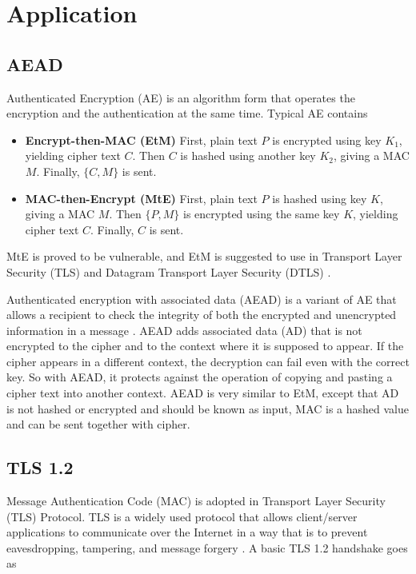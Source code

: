 \section{Application}

\subsection{AEAD}

	Authenticated Encryption (AE) is an algorithm form that operates the encryption and the authentication at the same time. Typical AE contains

	\begin{itemize}
		\item
			\textbf{Encrypt-then-MAC (EtM)}
			First, plain text $P$ is encrypted using key $K_1$, yielding cipher text $C$. Then $C$ is hashed using another key $K_2$, giving a MAC $M$. Finally, $\{C,M\}$ is sent.
		\item
			\textbf{MAC-then-Encrypt (MtE)}
			First, plain text $P$ is hashed using key $K$, giving a MAC $M$. Then $\{P,M\}$ is encrypted using the same key $K$, yielding cipher text $C$. Finally, $C$ is sent.
	\end{itemize}

	MtE is proved to be vulnerable, and EtM is suggested to use in Transport Layer Security (TLS) and Datagram Transport Layer Security (DTLS) \cite{etm}.

	Authenticated encryption with associated data (AEAD) is a variant of AE that allows a recipient to check the integrity of both the encrypted and unencrypted information in a message \cite{nist-18}. AEAD adds associated data (AD) that is not encrypted to the cipher and to the context where it is supposed to appear. If the cipher appears in a different context, the decryption can fail even with the correct key. So with AEAD, it protects against the operation of copying and pasting a cipher text into another context. AEAD is very similar to EtM, except that AD is not hashed or encrypted and should be known as input, MAC is a hashed value and can be sent together with cipher.

\subsection{TLS 1.2}

	Message Authentication Code (MAC) is adopted in Transport Layer Security (TLS) Protocol. TLS is a widely used protocol that allows client/server applications to communicate over the Internet in a way that is to prevent eavesdropping, tampering, and message forgery \cite{tls-1-2}. A basic TLS 1.2 handshake \cite{tls-1-2} goes as

